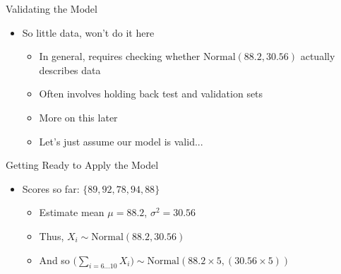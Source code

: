 \documentclass[aspectratio=169]{beamer}
\begin{document}
\begin{frame}{Validating the Model}

\begin{itemize}
	\item So little data, won't do it here
	\begin{itemize}
	\item In general, requires checking whether $\textrm{Normal} (88.2, 30.56)$ actually describes data
	\item Often involves holding back test and validation sets
	\item More on this later
	\item Let's just assume our model is valid...
	\end{itemize}
\end{itemize}
\end{frame}
\begin{frame}{Getting Ready to Apply the Model}

\begin{itemize}
	\item Scores so far: $\{89, 92, 78, 94, 88\}$
	\begin{itemize}
	\item Estimate mean $\mu = 88.2$, $\sigma^2 = 30.56$
	\item Thus, $X_i \sim \textrm{Normal} (88.2, 30.56)$
	\item And so $\big(\sum_{i=6...10} X_i\big) \sim \textrm{Normal} (88.2 \times 5, (30.56 \times 5))$
	\end{itemize}
\end{itemize}
\end{frame}
\end{document}

